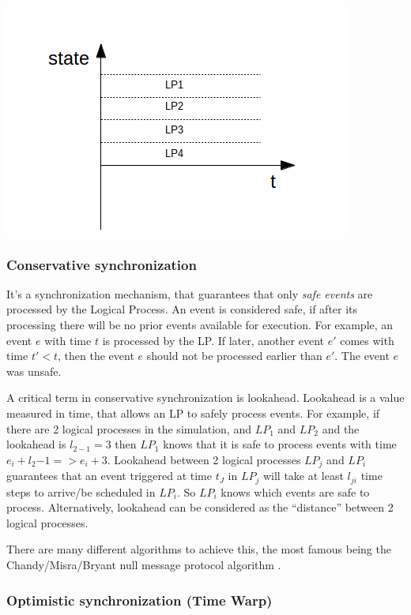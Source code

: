 \documentclass[a4paper]{article}
\begin{document}
\includegraphics{thesis-proposal-space-graph}

\subsubsection{Conservative synchronization}

It's a synchronization mechanism, that guarantees that only \emph{safe events}
are processed by the Logical Process. An event is considered safe, if after its
processing there will be no prior events available for execution. For example,
an event $e$ with time $t$ is processed by the LP. If later, another
event $e'$ comes with time $t' < t$, then the event $e$ should not be processed
earlier than $e'$. The event $e$ was unsafe.

A critical term in conservative synchronization is lookahead. Lookahead
is a value measured in time, that allows an LP to safely process events.
For example, if there are 2 logical processes in the simulation, and $LP_1$ and
$LP_2$ and the lookahead is $l_{2-1} = 3$ then $LP_1$ knows that it
is safe to process events with time $e_i + l_2{-1} => e_i + 3$. Lookahead
between 2 logical processes $LP_j$ and $LP_i$ guarantees that an event triggered
at time $t_J$ in $LP_j$ will take at least $l_{ji}$ time steps to arrive/be scheduled
in $LP_i$. So $LP_i$ knows which events are safe to process. Alternatively,
lookahead can be considered as the ``distance'' between 2 logical processes.

There are many different algorithms to achieve this, the most famous being the
Chandy/Misra/Bryant null message protocol algorithm \cite{misra_distributed_1986}.

\subsubsection{Optimistic synchronization (Time Warp)}
\end{document}
